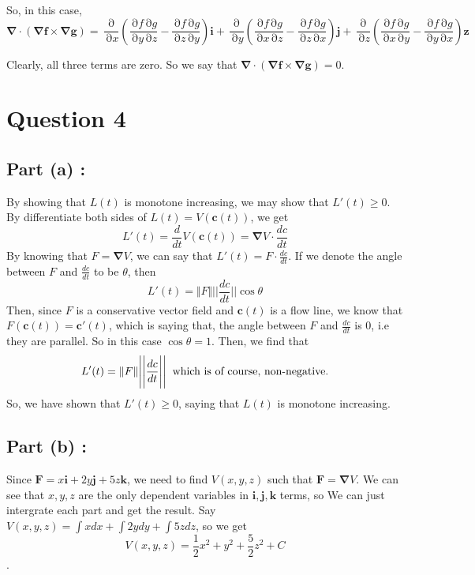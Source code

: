 \documentclass[12pt]{article}
\renewcommand{\vec}[1]{\boldsymbol{#1}}
\DeclareMathOperator{\pt}{\partial}
\begin{document}
So, in this case, 
\[\vec{\nabla} \cdot (\vec{\nabla f} \times
\vec{\nabla g}) = \frac{\pt}{\pt x} \left( \frac{\pt f \pt g}{\pt y \pt z} - \frac{\pt f \pt g}{\pt z \pt y}\right)\vec i
+ \frac{\pt}{\pt y} \left( \frac{\pt f \pt g}{\pt x \pt z} - \frac{\pt f \pt g}{\pt z \pt x}\right)\vec j
+\frac{\pt }{\pt z} \left( \frac{\pt f \pt g}{\pt x \pt y }-\frac{\pt f \pt g}{\pt y \pt x} \right)\vec z\]

Clearly, all three terms are zero. So we say that 
$\vec{\nabla} \cdot (\vec{\nabla f} \times
\vec{\nabla g}) = 0 $.

\newpage
\section*{Question 4}

\subsection*{Part (a) :}
By showing that $L(t)$ is monotone increasing, we may
show that $ L'(t) \geq 0 $. By differentiate both sides
of $L(t) = V(\vec c(t))$, we get 
\[ L'(t) = \frac{d}{dt}V(\vec c(t)) = 
\vec{\nabla} V \cdot \frac{dc}{dt}\]
By knowing that $F = \vec{\nabla}V$, we can say that
$\displaystyle{L'(t) = F \cdot \frac{dc}{dt}}$. If we
denote the angle between $F$ and $\displaystyle{\frac{dc}{dt}}$
to be $\theta$, then
\[ L'(t) = \Vert F \Vert
\Bigg |\Bigg|\frac{dc}{dt} \Bigg|\Bigg|\cos{\theta} \]
Then, since $F$ is a conservative vector field and
$\vec c(t)$ is a flow line, we know that
$F(\vec c(t)) = \vec c'(t)$, which is saying that,
the angle between $F$ and $\displaystyle{\frac{dc}{dt}}$
is $0$, i.e they are parallel. So in this case
$\cos{\theta} = 1$. Then, we find that
\[L'(t) = \Vert F \Vert \displaystyle{
    \Bigg| \Bigg| \frac{dc}{dt} \Bigg| \Bigg|
} \hspace*{0.2cm} \text{which is of course,
non-negative.}\]
So, we have shown that $L'(t) \geq 0$, saying that
$L(t)$ is monotone increasing.



\subsection*{Part (b) :}

Since $\vec{F} = x \vec i + 2y \vec j + 5z \vec k $,
we need to find $V(x,y,z)$ such that $\vec{F} = 
\vec{\nabla} V$.
We can see that $x,y,z$ are the only dependent
variables in $\vec i, \vec j, \vec k$ terms, so We
can just intergrate each part and get the result.
Say $V(x,y,z) = \displaystyle{ \int x dx + 
\int 2y dy + \int 5z dz }$, so we get
\[ V(x,y,z) = \frac{1}{2}x^2 + y^2 + \frac{5}{2}z^2
+ C \].
\end{document}
